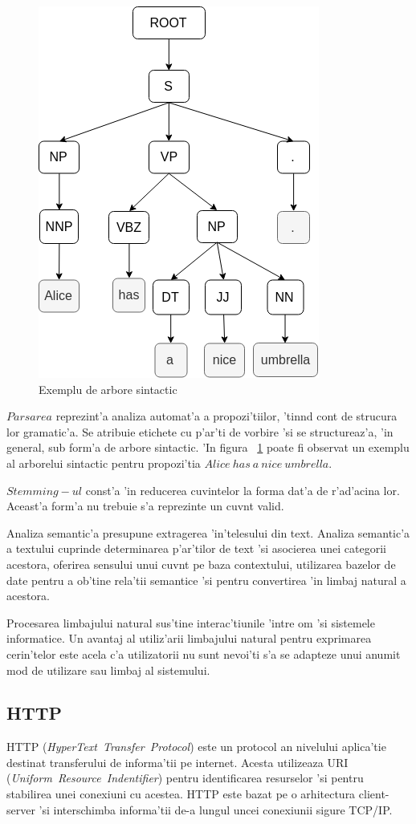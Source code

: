 \documentclass[12pt,a4paper,twoside]{report}
\begin{document}
\begin{figure}
    \centering
    \includegraphics[width = 0.5\linewidth]{img/alice_parse.png}
        \caption{Exemplu de arbore sintactic}
    \label{fig:alice_parse}
\end{figure}

$Parsarea$ reprezint'a analiza automat'a a propozi'tiilor, 'tin\ia nd cont de strucura lor gramatic'a. Se atribuie etichete cu p'ar'ti de vorbire 'si se structureaz'a, 'in general, sub form'a de arbore sintactic. 'In figura ~\ref{fig:alice_parse} poate fi observat un exemplu al arborelui sintactic pentru propozi'tia $Alice\ has\ a\ nice\ umbrella.$


$Stemming-ul$ const'a 'in reducerea cuvintelor la forma dat'a de r'ad'acina lor. Aceast'a form'a nu trebuie s'a reprezinte un cuv\ia nt valid.

Analiza semantic'a presupune extragerea 'in'telesului din text. Analiza semantic'a a textului cuprinde determinarea p'ar'tilor de text 'si asocierea unei categorii acestora, oferirea sensului unui cuv\ia nt pe baza contextului, utilizarea bazelor de date pentru a ob'tine rela'tii semantice 'si pentru convertirea 'in limbaj natural a acestora.


Procesarea limbajului natural sus'tine interac'tiunile 'intre om 'si sistemele informatice. Un avantaj al utiliz'arii limbajului natural pentru exprimarea cerin'telor este acela c'a utilizatorii nu sunt nevoi'ti s'a se adapteze unui anumit mod de utilizare sau limbaj al sistemului.

\subsection{HTTP}
HTTP ({\it HyperText\ Transfer\ Protocol}) este un protocol an nivelului aplica'tie destinat transferului de informa'tii pe internet.
Acesta utilizeaza URI ({\it Uniform\ Resource\ Indentifier}) pentru identificarea resurselor 'si pentru stabilirea unei conexiuni cu acestea. HTTP este bazat pe o arhitectura client-server 'si interschimba informa'tii de-a lungul uncei conexiunii sigure TCP/IP.
\end{document}
